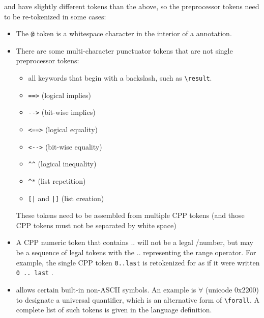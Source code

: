 \acsl and \acslpp have slightly different tokens than the above, so the preprocessor tokens need to be re-tokenized in some cases:
\begin{itemize}
	\item The \verb|@| token is a whitespace character in the interior of a \acslb annotation.
	\item There are some \acslb multi-character punctuator tokens that are not
	single preprocessor tokens:
	\begin{itemize}
        		\item all \acslb keywords that begin with a backslash, such as \verb|\result|.
		\item \verb|==>| (logical implies)
		\item \verb|-->| (bit-wise implies)
		\item \verb|<==>| (logical equality)
		\item \verb|<-->| (bit-wise equality)
		\item \verb|^^| (logical inequality)
		\item \verb|^*| (list repetition)
		\item \verb:[|: and \verb:|]: (list creation)
	\end{itemize}
	These \acslb tokens need to be assembled from multiple CPP tokens (and those CPP tokens must not be separated by white space)
	\item A CPP numeric token that contains .. will not be a legal \C/\cpp number, but may be a sequence of
 legal \acslb tokens with the .. representing the range operator.  For example, the single CPP token \texttt{0..last} is retokenized for \acslb as if it were written \texttt{0 .. last} .
	\item \acslb allows certain built-in non-ASCII symbols.
    An example is 
		$\forall$ (unicode 0x2200) to designate a universal quantifier,
    which is an alternative form of \verb|\forall|.
    A complete list of such tokens is given  in the \acslb language definition.
\end{itemize}

